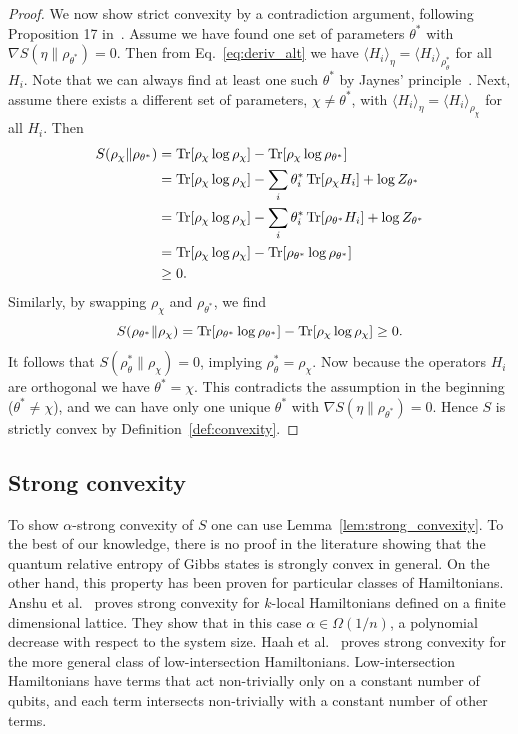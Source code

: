 \documentclass[
    aps,
    prx,
    onecolumn
]{revtex4-2}
\begin{document}
\begin{proof}
We now show strict convexity by a contradiction argument, following Proposition 17 in~\cite{Anshu_2021}. Assume we have found one set of parameters $\theta^*$ with $\nabla S(\eta \|\rho_{\theta^*})=0$. Then from Eq.~\eqref{eq:deriv_alt} we have $\langle H_{i}\rangle_\eta =\langle H_{i} \rangle_{\rho_\theta^*}$ for all $H_{i}$. Note that we can always find at least one such $\theta^*$ by Jaynes' principle~\cite{jaynes1957}. Next, assume there exists a different set of parameters, $\chi\neq\theta^*$, with $\langle H_{i}\rangle_\eta =\langle H_{i} \rangle_{\rho_\chi}$ for all $H_{i}$. Then
\begin{align}
\begin{split}
S(\rho_\chi \| \rho_{\theta^*}) &= \Tr[ \rho_\chi\log{\rho_\chi} ]-\Tr[ \rho_\chi\log{\rho_{\theta^*}} ] \\
&= \Tr[\rho_\chi\log{\rho_\chi}] - \sum_{i}\theta^*_{i}\Tr[\rho_\chi H_{i}] +\log{Z_{\theta^*}} \\
&= \Tr[\rho_\chi\log{\rho_\chi}] - \sum_{i}\theta^*_{i}\Tr[\rho_{\theta^*} H_{i}] +\log{Z_{\theta^*}} \\
&= \Tr[\rho_\chi\log{\rho_\chi}] - \Tr[\rho_{\theta^*}\log{\rho_{\theta^*}}] \\
&\geq 0. 
\end{split}
\end{align} 
Similarly, by swapping $\rho_\chi$ and $\rho_{\theta^*}$, we find \begin{equation}
S(\rho_{\theta^*}\|\rho_\chi) = \Tr[\rho_{\theta^*}\log{\rho_{\theta^*}}] - \Tr[\rho_\chi\log{\rho_\chi}] \geq 0.
\end{equation} 
It follows that $S(\rho_\theta^*\|\rho_\chi)=0$, implying $\rho_\theta^* = \rho_\chi$. Now because the operators $H_{i}$ are orthogonal we have $\theta^*=\chi$. This contradicts the assumption in the beginning ($\theta^*\neq\chi$), and we can have only one unique $\theta^*$ with $\nabla S(\eta \|\rho_{\theta^*})=0$. Hence $S$ is strictly convex by Definition~\ref{def:convexity}.
\end{proof}


\subsection{Strong convexity}
\label{app:strong_conv_numerics}

To show $\alpha$-strong convexity of $S$ one can use Lemma~\ref{lem:strong_convexity}. To the best of our knowledge, there is no proof in the literature showing that the quantum relative entropy of Gibbs states is strongly convex in general. On the other hand, this property has been proven for particular classes of Hamiltonians. Anshu et al.~\cite{Anshu_2021} proves strong convexity for $k$-local Hamiltonians defined on a finite dimensional lattice. They show that in this case $\alpha \in \Omega(1/n)$, a polynomial decrease with respect to the system size. Haah et al.~\cite{Haah_2022} proves strong convexity for the more general class of low-intersection Hamiltonians. Low-intersection Hamiltonians have terms that act non-trivially only on a constant number of qubits, and each term intersects non-trivially with a constant number of other terms.
\end{document}
